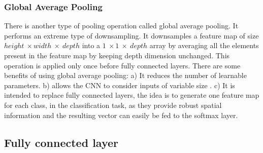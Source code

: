 \subsubsection{Global Average Pooling}
There is another type of pooling operation called global average pooling. It performs an extreme type of downsampling. It downsamples a feature map of size $height\ \times width\ \times\ depth$ into a $1\ \times 1\ \times\ depth$ array by averaging all the elements present in the feature map by keeping depth dimension unchanged. This operation is applied only once before fully connected layers. There are some benefits of using global average pooling: a)  It reduces the number of learnable parameters. b) allows the \ac{CNN} to consider inputs of variable size \cite{articleCNNs} \cite{lin2014network}. c) It is intended to replace fully connected layers, the idea is to generate one feature map for each class, in the classification task, as they provide robust spatial information and the resulting vector can easily be fed to the softmax layer\footnotemark.






\subsection{Fully connected layer}


